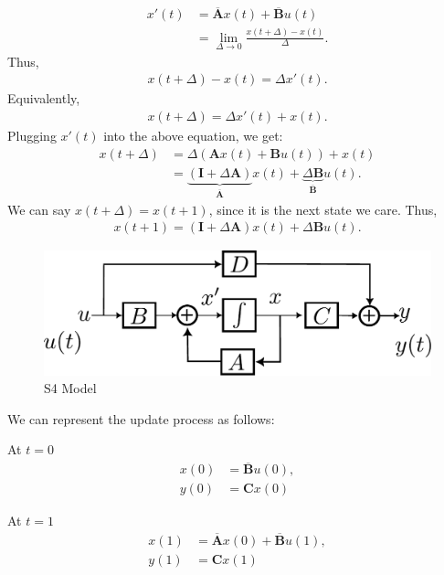 \begin{align*}
	x'(t) &= \overline{\mathbf{A}}x(t)+\overline{\mathbf{B}}u(t)\\
		  &= \lim_{\Delta\to 0} \frac{x(t+\Delta)-x(t)}{\Delta}.
\end{align*}
Thus, 
\begin{align*}
	x(t+\Delta)-x(t) = \Delta x'(t).
\end{align*}
Equivalently, 
\begin{align*}
	x(t+\Delta) = \Delta x'(t)+x(t). 
\end{align*}
Plugging $x'(t)$ into the above equation, we get:
\begin{align*}
	x(t+\Delta) &= \Delta (\mathbf{A}x(t)+\mathbf{B}u(t)) +x(t) \\
				&= \underbrace{(\mathbf{I}+\Delta \mathbf{A})}_{\overline{\mathbf{A}}}x(t)+\underbrace{\Delta \mathbf{B}}_{\overline{\mathbf{B}}}u(t).
\end{align*}
We can say $x(t+\Delta)=x(t+1)$, since it is the next state we care. Thus, 
\begin{align*}
	x(t+1)= (\mathbf{I}+\Delta \mathbf{A})x(t)+\Delta \mathbf{B}u(t).
\end{align*}




\begin{figure}[h]
	\centering
	\includegraphics[scale=0.6]{./images/nlp/ssm.pdf}
	\caption{S4 Model}
	\label{fig:nlp_s4_model}
\end{figure}

We can represent the update process as follows:

At $t=0$
\begin{align*}
	x(0) &= \overline{\mathbf{B}}u(0),\\
	y(0) &= \mathbf{C}x(0)
\end{align*}

At $t=1$
\begin{align*}
	x(1) &= \overline{\mathbf{A}}x(0)+\overline{\mathbf{B}}u(1),\\
	y(1) &= \mathbf{C}x(1)
\end{align*}

